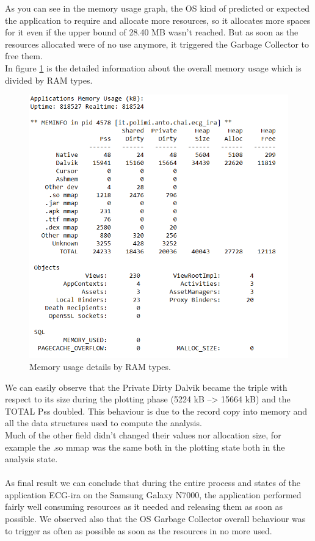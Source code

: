 As you can see in the memory usage graph, the OS kind of predicted or expected the application to require and allocate more resources, so it allocates more spaces for it even if the upper bound of 28.40 MB wasn’t reached. But as soon as the resources allocated were of no use anymore, it triggered the Garbage Collector to free them.\\
In figure \ref{fig10.19} is the detailed information about the overall memory usage which is divided by RAM types.
\begin{figure}[h]
	\centering	
	\includegraphics[width=0.6\linewidth]{figures/ch10/19.png}
	\caption{ Memory usage details by RAM types.}  
	\label{fig10.19}
\end{figure}
We can easily observe that the Private Dirty Dalvik became the triple with respect to its size during the plotting phase (5224 kB --> 15664 kB) and the TOTAL Pss doubled. This behaviour is due to the record copy into memory and all the data structures used to compute the analysis.\\
Much of the other field didn’t changed their values nor allocation size, for example the .so mmap was the same both in the plotting state both in the analysis state.\\
\\
As final result we can conclude that during the entire process and states of the application ECG-ira on the Samsung Galaxy N7000, the application performed fairly well consuming resources as it needed and releasing them as soon as possible. We observed also that the OS Garbage Collector overall behaviour was to trigger as often as possible as soon as the resources in no more used.

